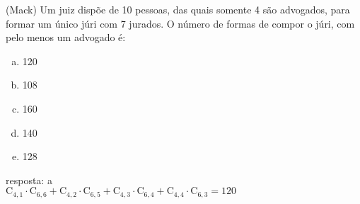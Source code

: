 \begin{ex}
 (Mack) Um juiz dispõe de 10 pessoas, das quais somente 4 são advogados, para formar um único júri com 7 jurados. O número de formas de compor o júri, com pelo menos um advogado é:   
    \begin{enumerate}[(a)]
    \item 120
    \item 108
    \item 160
    \item 140
    \item 128
    \end{enumerate}
      \begin{sol}
       resposta: a \\
       $\mathrm{C}_{4,1}\cdot\mathrm{C}_{6,6}+\mathrm{C}_{4,2}\cdot\mathrm{C}_{6,5}+\mathrm{C}_{4,3}\cdot\mathrm{C}_{6,4}+\mathrm{C}_{4,4}\cdot\mathrm{C}_{6,3}=120$
      \end{sol}
\end{ex}